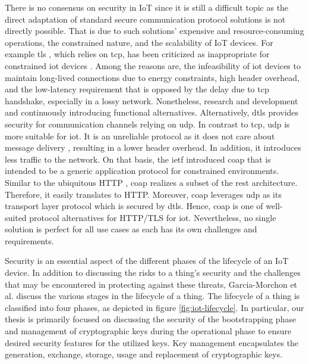 There is no consensus on security in IoT since it is still a difficult topic as the direct adaptation of standard secure communication protocol solutions is not directly possible. That is due to such solutions' expensive and resource-consuming operations, the constrained nature, and the scalability of IoT devices. For example \gls{tls} \cite{rfc5246}, which relies on \gls{tcp}, has been criticized as inappropriate for constrained \gls{iot} devices \cite{shang2016challenges}. Among the reasons are, the infeasibility of \gls{iot} devices to maintain long-lived connections due to energy constraints, high header overhead, and the low-latency requirement that is opposed by the delay due to \gls{tcp} handshake, especially in a lossy network. Nonetheless, research and development and continuously introducing functional alternatives. 
Alternatively, \gls{dtls} \cite{dtls} provides security for communication channels relying on \gls{udp}. In contrast to \gls{tcp}, \gls{udp} is more suitable for \gls{iot}. It is an unreliable protocol as it does not care about message delivery , resulting in a lower header overhead. In addition, it introduces less traffic to the network. On that basis, the \gls{ietf} introduced \gls{coap} \cite{rfc7252} that is intended to be a generic application protocol for constrained environments. Similar to the ubiquitous HTTP \cite{http}, \gls{coap} realizes a subset of the \gls{rest} architecture. Therefore, it easily translates to HTTP. Moreover, \gls{coap} leverages \gls{udp} as its transport layer protocol which is secured by \gls{dtls}. Hence, \gls{coap} is one of well-suited protocol alternatives for HTTP/TLS for \gls{iot}. Nevertheless, no single solution is perfect for all use cases as each has its own challenges and requirements.
\par
Security is an essential aspect of the different phases of the lifecycle of an IoT device. In addition to discussing the risks to a thing's security and the challenges that may be encountered in protecting against these threats, Garcia-Morchon et al. \cite{rfc8576} discuss the various stages in the lifecycle of a thing. The lifecycle of a thing is classified into four phases, as depicted in figure \ref{fig:iot-lifecycle}. In particular, our thesis is primarily focused on discussing the security of the bootstrapping phase and management of cryptographic keys during the operational phase to ensure desired security features for the utilized keys. Key management encapsulates the generation, exchange, storage, usage and replacement of cryptographic keys.
